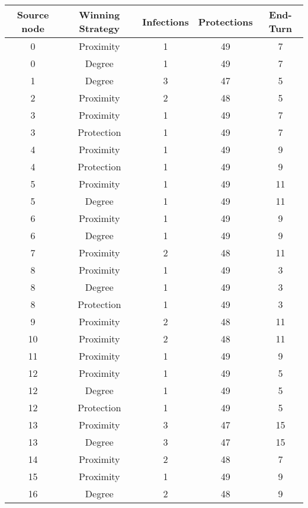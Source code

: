 \documentclass[results.tex]{subfiles}
\begin{document}
\begin{center}
  \begin{tabular}{| c || c | c | c | c |}
    \hline
    {\bfseries Source node} & {\bfseries Winning Strategy} & {\bfseries Infections} & {\bfseries Protections} & {\bfseries End-Turn} \\  %
    \hline\hline
    0 & Proximity & 1 & 49 & 7 \\ 
    \hline
    0 & Degree & 1 & 49 & 7 \\ 
    \hline
    1 & Degree & 3 & 47 & 5 \\ 
    \hline
    2 & Proximity & 2 & 48 & 5 \\ 
    \hline
    3 & Proximity & 1 & 49 & 7 \\ 
    \hline
    3 & Protection & 1 & 49 & 7 \\ 
    \hline
    4 & Proximity & 1 & 49 & 9 \\ 
    \hline
    4 & Protection & 1 & 49 & 9 \\ 
    \hline
    5 & Proximity & 1 & 49 & 11 \\ 
    \hline
    5 & Degree & 1 & 49 & 11 \\ 
    \hline
    6 & Proximity & 1 & 49 & 9 \\ 
    \hline
    6 & Degree & 1 & 49 & 9 \\ 
    \hline
    7 & Proximity & 2 & 48 & 11 \\ 
    \hline
    8 & Proximity & 1 & 49 & 3 \\ 
    \hline
    8 & Degree & 1 & 49 & 3 \\ 
    \hline
    8 & Protection & 1 & 49 & 3 \\ 
    \hline
    9 & Proximity & 2 & 48 & 11 \\ 
    \hline
    10 & Proximity & 2 & 48 & 11 \\ 
    \hline
    11 & Proximity & 1 & 49 & 9 \\ 
    \hline
    12 & Proximity & 1 & 49 & 5 \\ 
    \hline
    12 & Degree & 1 & 49 & 5 \\ 
    \hline
    12 & Protection & 1 & 49 & 5 \\ 
    \hline
    13 & Proximity & 3 & 47 & 15 \\ 
    \hline
    13 & Degree & 3 & 47 & 15 \\ 
    \hline
    14 & Proximity & 2 & 48 & 7 \\ 
    \hline
    15 & Proximity & 1 & 49 & 9 \\ 
    \hline
    16 & Degree & 2 & 48 & 9 \\ 

\end{tabular}
\end{center}
\end{document}
